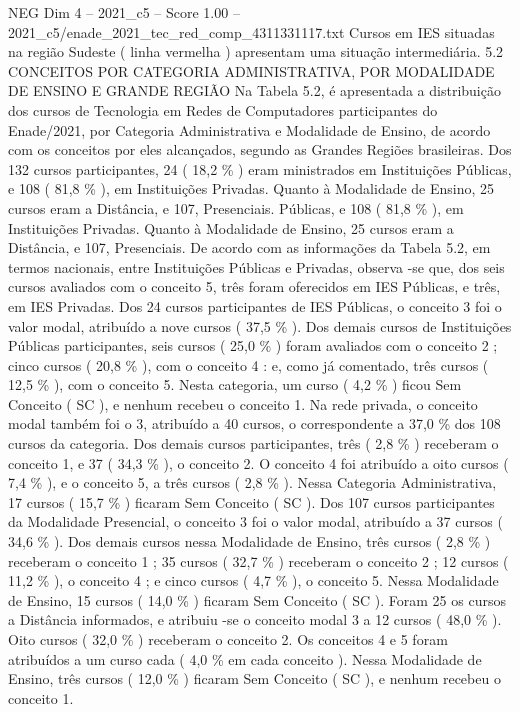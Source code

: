 \begin{textsample}{NEG Dim 4 – 2021\_c5 – Score 1.00 – 2021\_c5/enade\_2021\_tec\_red\_comp\_4311331117.txt}
Cursos em IES situadas na região Sudeste ( linha vermelha ) apresentam uma situação intermediária. 5.2 CONCEITOS POR CATEGORIA ADMINISTRATIVA, POR MODALIDADE DE ENSINO E GRANDE REGIÃO Na Tabela 5.2, é apresentada a distribuição dos cursos de Tecnologia em Redes de Computadores participantes do Enade/2021, por Categoria Administrativa e Modalidade de Ensino, de acordo com os conceitos por eles alcançados, segundo as Grandes Regiões brasileiras.
Dos 132 cursos participantes, 24 ( 18,2 \% ) eram ministrados em Instituições Públicas, e 108 ( 81,8 \% ), em Instituições Privadas.
Quanto à Modalidade de Ensino, 25 cursos eram a Distância, e 107, Presenciais.
Públicas, e 108 ( 81,8 \% ), em Instituições Privadas.
Quanto à Modalidade de Ensino, 25 cursos eram a Distância, e 107, Presenciais.
De acordo com as informações da Tabela 5.2, em termos nacionais, entre Instituições Públicas e Privadas, observa -se que, dos seis cursos avaliados com o conceito 5, três foram oferecidos em IES Públicas, e três, em IES Privadas.
Dos 24 cursos participantes de IES Públicas, o conceito 3 foi o valor modal, atribuído a nove cursos ( 37,5 \% ).
Dos demais cursos de Instituições Públicas participantes, seis cursos ( 25,0 \% ) foram avaliados com o conceito 2 ; cinco cursos ( 20,8 \% ), com o conceito 4 : e, como já comentado, três cursos ( 12,5 \% ), com o conceito 5.
Nesta categoria, um curso ( 4,2 \% ) ficou Sem Conceito ( SC ), e nenhum recebeu o conceito 1.
Na rede privada, o conceito modal também foi o 3, atribuído a 40 cursos, o correspondente a 37,0 \% dos 108 cursos da categoria.
Dos demais cursos participantes, três ( 2,8 \% ) receberam o conceito 1, e 37 ( 34,3 \% ), o conceito 2.
O conceito 4 foi atribuído a oito cursos ( 7,4 \% ), e o conceito 5, a três cursos ( 2,8 \% ).
Nessa Categoria Administrativa, 17 cursos ( 15,7 \% ) ficaram Sem Conceito ( SC ).
Dos 107 cursos participantes da Modalidade Presencial, o conceito 3 foi o valor modal, atribuído a 37 cursos ( 34,6 \% ).
Dos demais cursos nessa Modalidade de Ensino, três cursos ( 2,8 \% ) receberam o conceito 1 ; 35 cursos ( 32,7 \% ) receberam o conceito 2 ; 12 cursos ( 11,2 \% ), o conceito 4 ; e cinco cursos ( 4,7 \% ), o conceito 5.
Nessa Modalidade de Ensino, 15 cursos ( 14,0 \% ) ficaram Sem Conceito ( SC ).
Foram 25 os cursos a Distância informados, e atribuiu -se o conceito modal 3 a 12 cursos ( 48,0 \% ).
Oito cursos ( 32,0 \% ) receberam o conceito 2.
Os conceitos 4 e 5 foram atribuídos a um curso cada ( 4,0 \% em cada conceito ).
Nessa Modalidade de Ensino, três cursos ( 12,0 \% ) ficaram Sem Conceito ( SC ), e nenhum recebeu o conceito 1.

\end{textsample}
